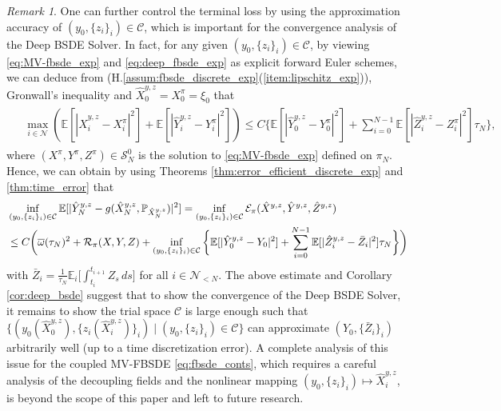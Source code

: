 \documentclass[11pt]{article}
\numberwithin{equation}{section}
\theoremstyle{definition}
\theoremstyle{remark}
\newtheorem{Remark}{Remark}[section]
\def\ol{\overline} \def\cl{\centerline}   \def\ul{\underline}
\def\l{\label}  \def\f{\frac}  \def\fa{\forall}
\def\cC{\mathcal{C}}
\def\cE{\mathcal{E}}
\def\cN{\mathcal{N}}
\def\cR{\mathcal{R}}
\def\cS{\mathcal{S}}
\def\sE{{\mathbb{E}}}
\def\sP{\mathbb{P}}
\begin{document}
\begin{Remark}
One can further control the terminal loss by using the approximation accuracy of 
$(y_0,\{z_i\}_i)\in \cC$,
which is important for the convergence analysis of the Deep BSDE Solver.
In fact, 
for any given $(y_0,\{z_i\}_i)\in \cC$, by viewing  \eqref{eq:MV-fbsde_exp} and   \eqref{eq:deep_fbsde_exp} as  explicit forward Euler schemes, 
we can deduce from  (H.\ref{assum:fbsde_discrete_exp}(\ref{item:lipschitz_exp})), 
 Gronwall's inequality 
 and $\hat{X}^{y,z}_{0}
={X}^\pi_{0}=\xi_0$ 
that
\begin{align*}
\begin{split}
&
\max_{i\in \cN}
\left(
\sE[|\hat{X}^{y,z}_{i}
-{X}^\pi_{i}|^2]
+
\sE[|\hat{Y}^{y,z}_{i}
-{Y}^\pi_{i}|^2]
\right)
\le 
C
\bigg\{
\sE[|\hat{Y}^{y,z}_{0}
-{Y}^\pi_{0}|^2]
+
\sum_{i=0}^{N-1}
\sE
[
|\hat{Z}^{y,z}_{i}
-{Z}^\pi_{i}|^2]\tau_N
\bigg\},
\end{split}
\end{align*}
where $(X^\pi,Y^\pi, Z^\pi)\in \cS^0_N$
is the solution to  \eqref{eq:MV-fbsde_exp}
defined on $\pi_N$. 
Hence, we can obtain by using  Theorems  \ref{thm:error_efficient_discrete_exp} and \ref{thm:time_error}
 that
\begin{align*}%
\begin{split}
&
\inf_{(y_0,\{z_i\}_i)\in \cC}
\sE[|\hat{Y}^{y,z}_N-g(\hat{X}^{y,z}_N,\sP_{\hat{X}^{y,z}_N})|^2]
=
\inf_{(y_0,\{z_i\}_i)\in \cC}
\cE_\pi(\hat{X}^{y,z},\hat{Y}^{y,z},\hat{Z}^{y,z})
\\
&\le 
C
\bigg(
\ol{\om}(\tau_N)^2
+
\cR_\pi(X,Y,Z)
+
\inf_{(y_0,\{z_i\}_i)\in \cC}
\bigg\{\sE[|\hat{Y}^{y,z}_{0}
-{Y}_{0}|^2]
+
\sum_{i=0}^{N-1}
\sE
[
|\hat{Z}^{y,z}_{i}
-\bar{Z}_{i}|^2]\tau_N
\bigg\}
\bigg)
\end{split}
\end{align*}
with $\bar{Z}_i=\frac{1}{\tau_N}\sE_i\big[\int_{t_i}^{t_{i+1}} Z_s\, ds\big]$
for all $i\in \cN_{<N}$.
The above estimate and Corollary  \ref{cor:deep_bsde} suggest that
 to show the convergence of the Deep BSDE Solver, 
it remains to show the trial space $\cC$ is large enough 
such that 
$\{(y_0(\hat{X}^{y,z}_0), \{z_i(\hat{X}^{y,z}_{i})\}_i)\mid (y_0,\{z_i\}_i)\in\cC\}$
can approximate $({Y}_{0},\{\bar{Z}_{i}\}_i)$ arbitrarily well  
(up to a time discretization error).
A complete  analysis of  this issue
for the coupled MV-FBSDE \eqref{eq:fbsde_conts},
which  requires a careful analysis of the decoupling fields  
and the nonlinear mapping $(y_0,\{z_i\}_i)\mapsto \hat{X}^{y,z}_{i}$,
 is beyond the scope of this paper and   left to future
research.
\end{Remark}
\end{document}
